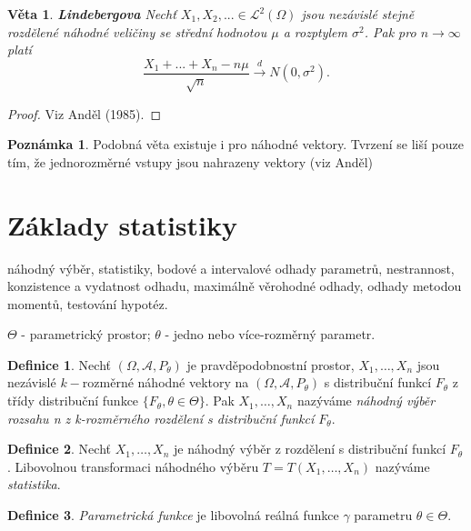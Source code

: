 \documentclass[a4]{report}
\newtheorem{theorem}{Věta}
\theoremstyle{definition}
\newtheorem{definition}{Definice}[section]
\newtheorem{remark}{Poznámka}[section]
\begin{document}
{\begin{theorem}{\textbf{Lindebergova}}
Nechť $X_{1}, X_{2}, ... \in \mathcal{L}^{2}(\Omega) $ jsou nezávislé stejně rozdělené náhodné veličiny se střední hodnotou $\mu$ a rozptylem $\sigma^{2}$. Pak pro $n \longrightarrow \infty$ platí 
\begin{equation}
\frac{X_{1}+ ... + X_{n} - n\mu}{\sqrt{n}} \xrightarrow{d} N(0, \sigma^{2}).
\end{equation}
\end{theorem}
\begin{proof}
Viz Anděl (1985).
\end{proof}

\begin{remark}
Podobná věta existuje i pro náhodné vektory. Tvrzení se liší pouze tím, že jednorozměrné vstupy jsou nahrazeny vektory (viz Anděl)
\end{remark}

\section{Základy statistiky}
náhodný  výběr,  statistiky,  bodové  a  intervalové  odhady parametrů,  nestrannost,  konzistence  a  vydatnost  odhadu, maximálně  věrohodné odhady, odhady metodou momentů, testování hypotéz.

$\Theta$ - parametrický prostor; $\theta$ - jedno nebo více-rozměrný parametr.

\begin{definition}
Nechť $\left(\Omega, \mathcal{A}, P_{\theta} \right)$ je pravděpodobnostní prostor, $X_1,\ldots,X_n$ jsou nezávislé $k-$rozměrné náhodné vektory na $\left(\Omega, \mathcal{A}, P_{\theta} \right)$ s distribuční funkcí $F_{\theta}$ z třídy distribuční funkce $\{F_{\theta}, \theta \in \Theta \}$. Pak  $X_1,\ldots,X_n$ nazýváme \textit{náhodný výběr rozsahu n z k-rozměrného rozdělení s distribuční funkcí $F_{\theta}$}. 
\end{definition}

\begin{definition}
Nechť $X_1,\ldots,X_n$ je náhodný výběr z rozdělení s distribuční funkcí $F_{\theta}$. Libovolnou transformaci náhodného výběru $T=T \left(X_1,\ldots,X_n \right)$ nazýváme \textit{statistika}. 
\end{definition}

\begin{definition}
\textit{Parametrická funkce} je libovolná reálná funkce $\gamma$ parametru $\theta \in \Theta$.
\end{definition}

}
\end{document}
